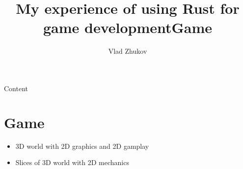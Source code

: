 \documentclass{beamer}
\title{My experience of using Rust for game development}	%
\author{Vlad Zhukov}
\date{}
\begin{document}
    \begin{frame}
      \titlepage
    \end{frame}
    
    \begin{frame}{Content}
      \tableofcontents
    \end{frame}

    \section{Game}
    \begin{frame}
      \title{Game}
      \begin{itemize}
        \item 3D world with 2D graphics and 2D gamplay
        \item Slices of 3D world with 2D mechanics
      \end{itemize}
    \end{frame}


\end{document}
